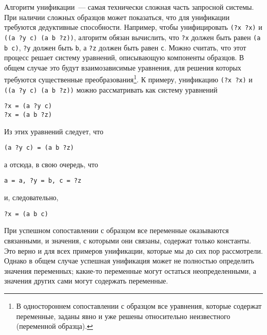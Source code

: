 Алгоритм унификации~--- самая технически сложная часть
запросной системы.  При наличии сложных образцов может показаться, что
для унификации требуются дедуктивные способности.  Например, чтобы
унифицировать {\tt (?x ?x)} и {\tt ((a ?y c) (a b ?z))},
алгоритм обязан вычислить, что {\tt ?x} должен быть равен
{\tt (a b c)}, {\tt ?y} должен быть {\tt b}, а
{\tt ?z} должен быть равен {\tt c}. Можно считать, что
этот процесс решает систему уравнений, описывающую компоненты
образцов.  В общем случае это будут взаимозависимые уравнения, для
решения которых требуются существенные преобразования\footnote{В 
одностороннем сопоставлении с образцом все
уравнения, которые содержат переменные, заданы явно и уже решены
относительно неизвестного (переменной образца).}.
К примеру,
унификацию {\tt (?x ?x)} и {\tt ((a ?y c) (a b ?z))}
можно рассматривать как систему уравнений

\begin{Verbatim}[fontsize=\small]
?x = (a ?y c)
?x = (a b ?z)
\end{Verbatim}
Из этих уравнений следует, что

\begin{Verbatim}[fontsize=\small]
(a ?y c) = (a b ?z)
\end{Verbatim}
а отсюда, в свою очередь, что

\begin{Verbatim}[fontsize=\small]
a = a, ?y = b, c = ?z
\end{Verbatim}
и, следовательно,

\begin{Verbatim}[fontsize=\small]
?x = (a b c)
\end{Verbatim}

При 
успешном сопоставлении с образцом все переменные 
оказываются связанными, и значения, с которыми они связаны, содержат
только константы.  Это верно и для всех примеров унификации, которые
мы до сих пор рассмотрели.  Однако в общем случае успешная унификация
может не полностью определить значения переменных; какие-то переменные
могут остаться неопределенными, а значения других сами могут содержать
переменные.

